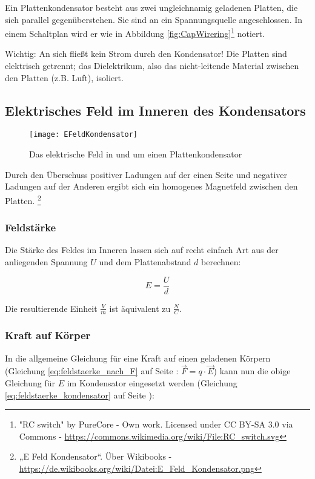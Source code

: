 Ein Plattenkondensator besteht aus zwei ungleichnamig geladenen Platten, die sich parallel gegenüberstehen. Sie sind an ein Spannungsquelle angeschlossen. In einem Schaltplan wird er wie in Abbildung \ref{fig:CapWirering}\footnote{"RC switch" by PureCore - Own work. Licensed under CC BY-SA 3.0 via Commons - \url{https://commons.wikimedia.org/wiki/File:RC_switch.svg}} notiert.

\begin{leftbar}
Wichtig: An sich fließt kein Strom durch den Kondensator! Die Platten sind elektrisch getrennt; das Dielektrikum, also das nicht-leitende Material zwischen den Platten (z.B. Luft), isoliert. 
\end{leftbar}


\subsection{Elektrisches Feld im Inneren des Kondensators}

\begin{figure}[h!]
	\centering
	\texttt{[image: EFeldKondensator]}
	\caption{Das elektrische Feld in und um einen Plattenkondensator}
\end{figure}

Durch den Überschuss  positiver Ladungen auf der einen Seite und negativer Ladungen auf der Anderen ergibt sich ein homogenes Magnetfeld zwischen den Platten. \footnote{„E Feld Kondensator“. Über Wikibooks - \url{https://de.wikibooks.org/wiki/Datei:E_Feld_Kondensator.png}}

\subsubsection{Feldstärke}

Die Stärke des Feldes im Inneren lassen sich auf recht einfach Art aus der anliegenden Spannung $U$ und dem Plattenabstand $d$ berechnen:

\begin{equation} \label{eq:feldstaerke_kondensator}
	E = \frac{U}{d}
\end{equation}

Die resultierende Einheit $\frac{V}{m}$ ist äquivalent zu $\frac{N}{C}$.

\subsubsection{Kraft auf Körper}

In die allgemeine Gleichung für eine Kraft auf einen geladenen Körpern (Gleichung \ref{eq:feldstaerke_nach_F} auf Seite \pageref{eq:feldstaerke_nach_F}: $\vec{F} = q \cdot \vec{E}$) kann nun die obige Gleichung für $E$ im Kondensator eingesetzt werden (Gleichung \ref{eq:feldstaerke_kondensator} auf Seite \pageref{eq:feldstaerke_kondensator}):

